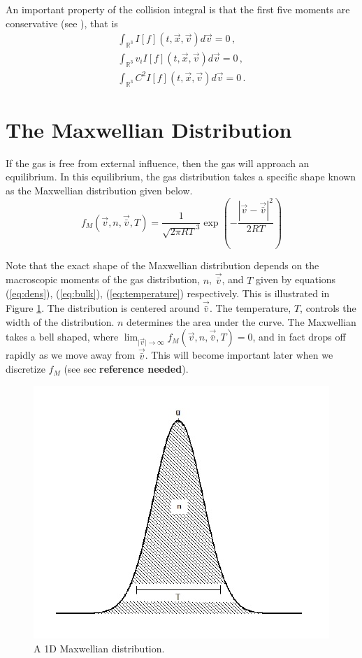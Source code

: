 \documentclass[12pt]{CSUNthesis}
\newcommand{\bulkv}{\vec{\bar{v}}} %
\begin{document}
An important property of the collision integral is that the first five moments are conservative (see \cite{Kremer2010}), that is
\begin{equation}
\label{eq:I_conservative}
\begin{split}
	\int_{\mathbb{R}^3}  I[f](t,\vec{x},\vec{v}) d\vec{v} = 0\, ,  \\
	\int_{\mathbb{R}^3} v_i I[f](t,\vec{x},\vec{v}) d\vec{v} = 0\, ,  \\
	\int_{\mathbb{R}^3} C^2 I[f](t,\vec{x},\vec{v}) d\vec{v} = 0 \, .
\end{split}
\end{equation}

\section{The Maxwellian Distribution}

If the gas is free from external influence, then the gas will approach an equilibrium. In this equilibrium, the gas distribution takes a specific shape known as the Maxwellian distribution given below.
\begin{equation}
\label{eq:maxwellian}
f_M(\vec{v},n,\vec{\bar{v}},T) = \frac{1}{\sqrt{2 \pi R T}^3} \exp\left( -\frac{ |\vec{v} - \vec{\bar{v}}|^2}{2RT} \right)
\end{equation} 
	
Note that the exact shape of the Maxwellian distribution depends on the macroscopic moments of the gas distribution, $n$, $\vec{\bar{v}}$, and $T$ given by equations (\ref{eq:dens}), (\ref{eq:bulk}), (\ref{eq:temperature}) respectively. This is illustrated in Figure \ref{fig:1d_maxwellian}. The distribution is centered around $\bulkv$. The temperature, $T$, controls the width of the distribution. $n$ determines the area under the curve. 
The Maxwellian takes a bell shaped, where $\lim_{\lvert \vec{v} \lvert \rightarrow \infty} f_M(\vec{v},n, \vec{\bar{v}}, T) = 0 $, and in fact drops off rapidly as we move away from $\vec{\bar{v}}$. This will become important later when we discretize $f_M$ (see sec \textbf{reference needed}).
\begin{figure}[h]
\centering
\includegraphics[scale=.5]{1D_Maxwellian}
\caption{A 1D Maxwellian distribution. }
\label{fig:1d_maxwellian}
\end{figure}
\end{document}
